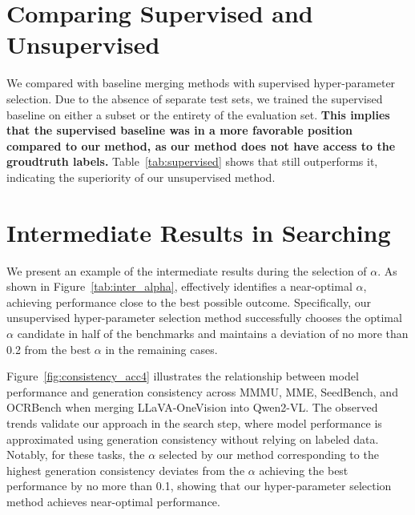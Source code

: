 \section{Comparing Supervised and Unsupervised}
\label{appendix:unsupervised}

We compared \ours with baseline merging methods with supervised hyper-parameter selection. Due to the absence of separate test sets, we trained the supervised baseline on either a subset or the entirety of the evaluation set. \textbf{This implies that the supervised baseline was in a more favorable position compared to our method, as our method does not have access to the groudtruth labels.} Table~\ref{tab:supervised} shows that \ours still outperforms it, indicating the superiority of our unsupervised method.



\section{Intermediate Results in Searching}
\label{appendix:searching}

We present an example of the intermediate results during the selection of $\alpha$. As shown in Figure~\ref{tab:inter_alpha}, \ours effectively identifies a near-optimal $\alpha$, achieving performance close to the best possible outcome. Specifically, our unsupervised hyper-parameter selection method successfully chooses the optimal $\alpha$ candidate in half of the benchmarks and maintains a deviation of no more than 0.2 from the best $\alpha$ in the remaining cases.

Figure~\ref{fig:consistency_acc4} illustrates the relationship between model performance and generation consistency across MMMU, MME, SeedBench, and OCRBench when merging LLaVA-OneVision into Qwen2-VL. The observed trends validate our approach in the search step, where model performance is approximated using generation consistency without relying on labeled data. Notably, for these tasks, the $\alpha$ selected by our method corresponding to the highest generation consistency deviates from the $\alpha$ achieving the best performance by no more than 0.1, showing that our hyper-parameter selection method achieves near-optimal performance.


